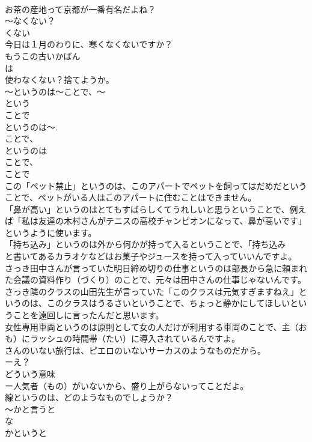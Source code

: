 \documentclass[8pt]{extreport}
\begin{document}
\begin{CJK}{UTF8}{min}
\\	お茶の産地って京都が一番有名だよね？
\\	～なくない？
\\	くない 
\\	今日は１月のわりに、寒くなくないですか？
\\	もうこの古いかばん
\\	は
\\	使わなくない？捨てようか。
\\	～というのは～ことで、～
\\	という 
\\	ことで 
\\	というのは～.
\\	ことで、 
\\	というのは
\\	ことで、
\\	ことで 
\\	この「ペット禁止」というのは、このアパートでペットを飼ってはだめだということで、ペットがいる人はこのアパートに住むことはできません。
\\	「鼻が高い」というのはとてもすばらしくてうれしいと思うということで、例えば「私は友達の木村さんがテニスの高校チャンピオンになって、鼻が高いです」というように使います。
\\	「持ち込み」というのは外から何かが持って入るということで、「持ち込み
\\	と書いてあるカラオケなどはお菓子やジュースを持って入っていいんですよ。
\\	さっき田中さんが言っていた明日締め切りの仕事というのは部長から急に頼まれた会議の資料作り（づくり）のことで、元々は田中さんの仕事じゃないんです。
\\	さっき隣のクラスの山田先生が言っていた「このクラスは元気すぎますねえ」というのは、このクラスはうるさいということで、ちょっと静かにしてほしいということを遠回しに言ったんだと思います。
\\	女性専用車両というのは原則として女の人だけが利用する車両のことで、主（おも）にラッシュの時間帯（たい）に導入されているんですよ。
\\	さんのいない旅行は、ピエロのいないサーカスのようなものだから。
\\	ーえ？
\\	どういう意味
\\	ー人気者（もの）がいないから、盛り上がらないってことだよ。
\\	線というのは、どのようなものでしょうか？ 
\\	～かと言うと
\\	な
\\	かというと 

\end{CJK}
\end{document}
